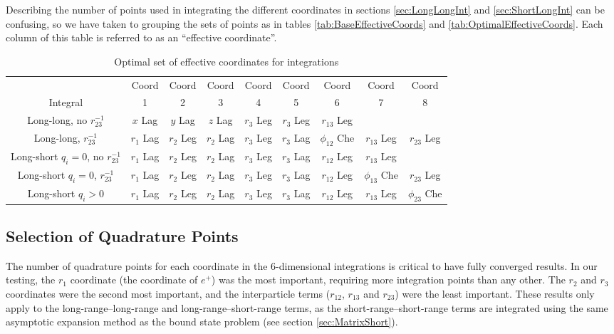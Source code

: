\documentclass[Dissertation.tex]{subfiles}
\begin{document}
Describing the number of points used in integrating the different coordinates in sections \ref{sec:LongLongInt} and \ref{sec:ShortLongInt} can be confusing, so we have taken to grouping the sets of points as in tables \ref{tab:BaseEffectiveCoords} and \ref{tab:OptimalEffectiveCoords}. Each column of this table is referred to as an ``effective coordinate''.

\begin{table}[H]
\centering
\footnotesize
\begin{tabular}{c c c c c c c c c}
\toprule
 & Coord & Coord & Coord & Coord & Coord & Coord & Coord & Coord \\
Integral & 1 & 2 & 3 & 4 & 5 & 6 & 7 & 8 \\
\midrule
 Long-long, no $r_{23}^{-1}$ & $x$ Lag & $y$ Lag & $z$ Lag & $r_3$ Leg & $r_3$ Leg & $r_{13}$ Leg & & \\
 Long-long, $r_{23}^{-1}$ & $r_1$ Lag & $r_2$ Leg & $r_2$ Lag & $r_3$ Leg & $r_3$ Lag & $\phi_{12}$ Che & $r_{13}$ Leg & $r_{23}$ Leg \\
\midrule
 Long-short $q_i = 0$, no $r_{23}^{-1}$ & $r_1$ Lag & $r_2$ Leg & $r_2$ Lag & $r_3$ Leg & $r_3$ Lag & $r_{12}$ Leg & $r_{13}$ Leg & \\
 Long-short $q_i = 0$, $r_{23}^{-1}$ & $r_1$ Lag & $r_2$ Leg & $r_2$ Lag & $r_3$ Leg & $r_3$ Lag & $r_{12}$ Leg & $\phi_{13}$ Che & $r_{23}$ Leg \\
 Long-short $q_i > 0$ & $r_1$ Lag & $r_2$ Leg & $r_2$ Lag & $r_3$ Leg & $r_3$ Lag & $r_{12}$ Leg & $r_{13}$ Leg & $\phi_{23}$ Che \\
\bottomrule
\end{tabular}
\caption{Optimal set of effective coordinates for integrations}
\label{tab:EffectiveCoords}
\end{table}


\subsection{Selection of Quadrature Points}
\label{sec:SelQuadPoints1}
The number of quadrature points for each coordinate in the 6-dimensional integrations is critical to have fully converged results. In our testing, the $r_1$ coordinate (the coordinate of $e^+$) was the most important, requiring more integration points than any other. The $r_2$ and $r_3$ coordinates were the second most important, and the interparticle terms ($r_{12}$, $r_{13}$ and $r_{23}$) were the least important. These results only apply to the long-range--long-range and long-range--short-range terms, as the short-range--short-range terms are integrated using the same asymptotic expansion method as the bound state problem (see section \ref{sec:MatrixShort}).
\end{document}
